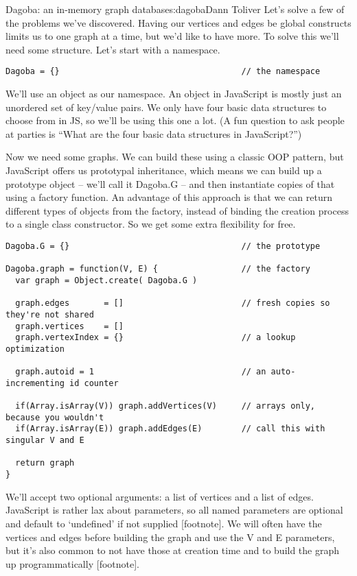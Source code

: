 \begin{aosachapter}{Dagoba: an in-memory graph database}{s:dagoba}{Dann Toliver}
Let's solve a few of the problems we've discovered. Having our vertices
and edges be global constructs limits us to one graph at a time, but
we'd like to have more. To solve this we'll need some structure. Let's
start with a namespace.

\begin{verbatim}
Dagoba = {}                                     // the namespace
\end{verbatim}

We'll use an object as our namespace. An object in JavaScript is mostly
just an unordered set of key/value pairs. We only have four basic data
structures to choose from in JS, so we'll be using this one a lot. (A
fun question to ask people at parties is ``What are the four basic data
structures in JavaScript?'')

Now we need some graphs. We can build these using a classic OOP pattern,
but JavaScript offers us prototypal inheritance, which means we can
build up a prototype object -- we'll call it Dagoba.G -- and then
instantiate copies of that using a factory function. An advantage of
this approach is that we can return different types of objects from the
factory, instead of binding the creation process to a single class
constructor. So we get some extra flexibility for free.

\begin{verbatim}
Dagoba.G = {}                                   // the prototype

Dagoba.graph = function(V, E) {                 // the factory
  var graph = Object.create( Dagoba.G )

  graph.edges       = []                        // fresh copies so they're not shared
  graph.vertices    = []
  graph.vertexIndex = {}                        // a lookup optimization
  
  graph.autoid = 1                              // an auto-incrementing id counter
  
  if(Array.isArray(V)) graph.addVertices(V)     // arrays only, because you wouldn't
  if(Array.isArray(E)) graph.addEdges(E)        // call this with singular V and E
  
  return graph
}
\end{verbatim}

We'll accept two optional arguments: a list of vertices and a list of
edges. JavaScript is rather lax about parameters, so all named
parameters are optional and default to `undefined' if not supplied
{[}footnote{]}. We will often have the vertices and edges before
building the graph and use the V and E parameters, but it's also common
to not have those at creation time and to build the graph up
programmatically {[}footnote{]}.


\end{aosachapter}
